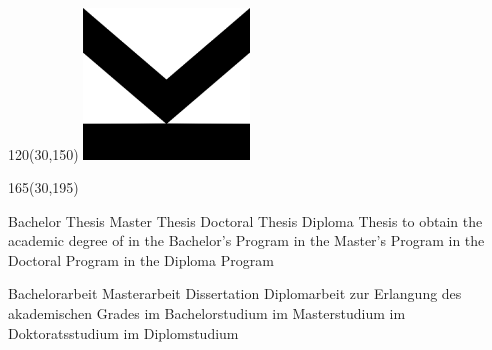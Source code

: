 
\begin{textblock}{120}(30,150)
	\includegraphics[width=44mm]{cover/arr}
\end{textblock}

\begin{textblock}{165}(30,195)
	\begin{minipage}[t]{120mm}
		\Large
		\ifeng
			\ifcase\type
				\ifdefined\subtitle
					\LARGE
					\subtitle
				\else
					\relax
				\fi
				\or Bachelor Thesis 
				\or Master Thesis 
				\or Doctoral Thesis 
				\or Diploma Thesis 
			\fi 
			\vskip1mm
			\ifcase\type 
				\relax 
			\else 
				{
					\normalsize to obtain the academic degree of
				}
				\vskip2mm 
			\fi
			\ifcase\type
				\relax 
			\else 
				\acadDegree
				\vskip1mm 
			\fi 
			{
				\normalsize 
				\ifcase\type
					\relax 
					\or in the Bachelor's Program 
					\or in the Master's Program 
					\or in the Doctoral Program 
					\or in the Diploma Program 
				\fi
			} 
			\vskip2mm
			\ifcase\type 
				\relax 
			\else
				\study 
			\fi
		\else
			\ifcase\type
				\ifdefined\subtitle
					\LARGE\subtitle
				\else
					\relax
				\fi
				\or Bachelorarbeit 
				\or Masterarbeit 
				\or Dissertation 
				\or Diplomarbeit 
			\fi 
			\vskip1mm
			\ifcase\type 
				\relax 
			\else
				{
					\normalsize zur Erlangung des akademischen Grades
				}
				\vskip2mm 
			\fi
			\ifcase\type 
				\relax 
			\else
				\acadDegree \vskip1mm 
			\fi 
			{
				\normalsize 
				\ifcase\type 
					\relax 
					\or im Bachelorstudium 
					\or im Masterstudium 
					\or im Doktoratsstudium 
					\or im Diplomstudium 
				\fi
			} \vskip2mm
			\ifcase\type 
				\relax 
			\else
				\study 
			\fi
		\fi
	\end{minipage}
\end{textblock}
